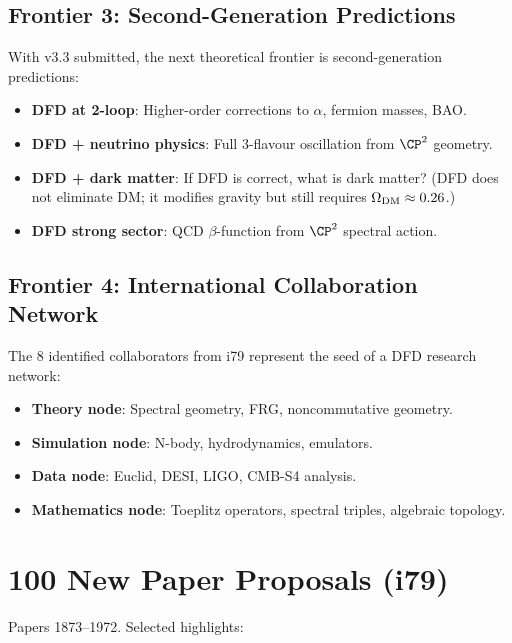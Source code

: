 \documentclass[11pt,a4paper]{article}
\begin{document}
\subsection{Frontier 3: Second-Generation Predictions}
With v3.3 submitted, the next theoretical frontier is second-generation predictions:
\begin{itemize}[nosep]
\item \textbf{DFD at 2-loop}: Higher-order corrections to $\alpha$, fermion masses, BAO.
\item \textbf{DFD + neutrino physics}: Full 3-flavour oscillation from $\CP^2$ geometry.
\item \textbf{DFD + dark matter}: If DFD is correct, what is dark matter? (DFD does not eliminate DM; it modifies gravity but still requires $\Omega_{\rm DM} \approx 0.26$.)
\item \textbf{DFD strong sector}: QCD $\beta$-function from $\CP^2$ spectral action.
\end{itemize}

\subsection{Frontier 4: International Collaboration Network}
The 8 identified collaborators from i79 represent the seed of a DFD research network:
\begin{itemize}[nosep]
\item \textbf{Theory node}: Spectral geometry, FRG, noncommutative geometry.
\item \textbf{Simulation node}: N-body, hydrodynamics, emulators.
\item \textbf{Data node}: Euclid, DESI, LIGO, CMB-S4 analysis.
\item \textbf{Mathematics node}: Toeplitz operators, spectral triples, algebraic topology.
\end{itemize}

\section{100 New Paper Proposals (i79)}

Papers 1873--1972. Selected highlights:
\end{document}

